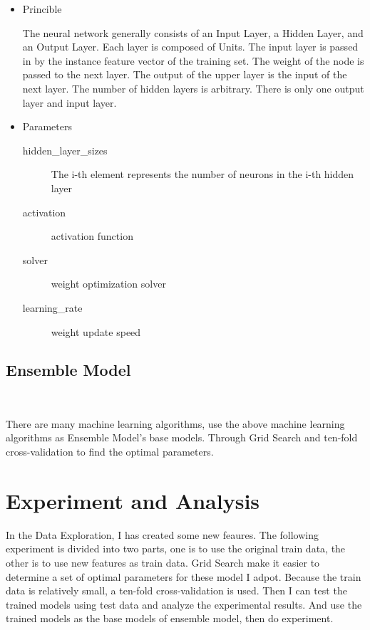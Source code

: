 \begin{itemize}
	\item Princible
	
	The neural network generally consists of 
	an Input Layer, a Hidden Layer, and an Output Layer. 
	Each layer is composed of Units. 
	The input layer is passed in by 
	the instance feature vector of the training set. 
	The weight of the node is passed to the next layer. 
	The output of the upper layer is 
	the input of the next layer. 
	The number of hidden layers is arbitrary. 
	There is only one output layer and input layer.
	
	\item Parameters
	
	\begin{description}
		\item[hidden_layer_sizes] The i-th element represents 
		the number of neurons in the i-th hidden layer
		\item[activation] activation function
		\item[solver] weight optimization solver
		\item[learning_rate] weight update speed
	\end{description}
\end{itemize}

\subsection{Ensemble Model}
\

There are many machine learning algorithms, 
use the above machine learning algorithms 
as Ensemble Model’s base models. 
Through Grid Search and
ten-fold cross-validation
to find the optimal parameters.

\section{Experiment and Analysis}

In the Data Exploration, 
I has created some new feaures.
The following experiment is divided into two parts,
one is to use the original train data, 
the other is to use new features as train data.
Grid Search make it easier to 
determine a set of optimal parameters
for these model I adpot.
Because the train data is relatively small, 
a ten-fold cross-validation is used. 
Then I can test the trained models 
using test data and 
analyze the experimental results.
And use the trained models as 
the base models of ensemble model,
then do experiment. 
\WBJianginMarker

